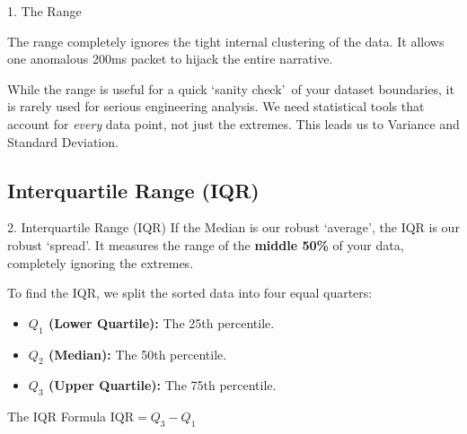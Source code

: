 \begin{frame}{1. The Range}
{\begin{example}
            The range completely ignores the tight internal clustering of the data. It allows one anomalous 200ms packet to hijack the entire narrative.
        \end{example}
        
        While the range is useful for a quick \lq sanity check\rq\ of your dataset boundaries, it is rarely used for serious engineering analysis. We need statistical tools that account for \textit{every} data point, not just the extremes. This leads us to Variance and Standard Deviation.
    }
\end{frame}

\subsection{Interquartile Range (IQR)}
\begin{frame}{2. Interquartile Range (IQR)}
    If the Median is our robust \lq average\rq, the IQR is our robust \lq spread\rq. 
    It measures the range of the \textbf{middle 50\%} of your data, completely ignoring the extremes.
    
    
    \begin{definition}[Quartiles]
        To find the IQR, we split the sorted data into four equal quarters:
        \begin{itemize}
            \item \textbf{$Q_1$ (Lower Quartile):} The 25th percentile.
            \item \textbf{$Q_2$ (Median):} The 50th percentile.
            \item \textbf{$Q_3$ (Upper Quartile):} The 75th percentile.
        \end{itemize}
    \end{definition}
    
    \begin{block}{The IQR Formula}
        \centering
        $\text{IQR} = Q_3 - Q_1$
    \end{block}
    

\end{frame}

